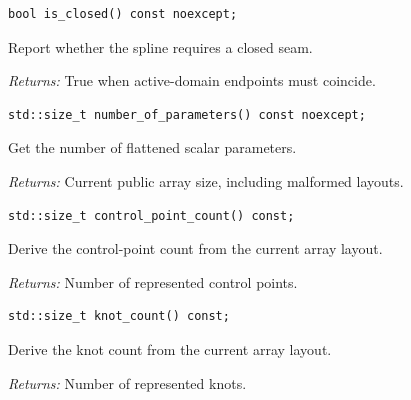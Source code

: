 \par\noindent\begin{minipage}{\linewidth}
\begin{lstlisting}[style=apireference]
bool is_closed() const noexcept;
\end{lstlisting}
{\footnotesize Report whether the spline requires a closed seam.\par}
{\footnotesize\textit{Returns:} True when active-domain endpoints must coincide.\par}
\end{minipage}\par\vspace{1pt}
\par\noindent\begin{minipage}{\linewidth}
\begin{lstlisting}[style=apireference]
std::size_t number_of_parameters() const noexcept;
\end{lstlisting}
{\footnotesize Get the number of flattened scalar parameters.\par}
{\footnotesize\textit{Returns:} Current public array size, including malformed layouts.\par}
\end{minipage}\par\vspace{1pt}
\par\noindent\begin{minipage}{\linewidth}
\begin{lstlisting}[style=apireference]
std::size_t control_point_count() const;
\end{lstlisting}
{\footnotesize Derive the control-point count from the current array layout.\par}
{\footnotesize\textit{Returns:} Number of represented control points.\par}
\end{minipage}\par\vspace{1pt}
\par\noindent\begin{minipage}{\linewidth}
\begin{lstlisting}[style=apireference]
std::size_t knot_count() const;
\end{lstlisting}
{\footnotesize Derive the knot count from the current array layout.\par}
{\footnotesize\textit{Returns:} Number of represented knots.\par}
\end{minipage}\par\vspace{1pt}
